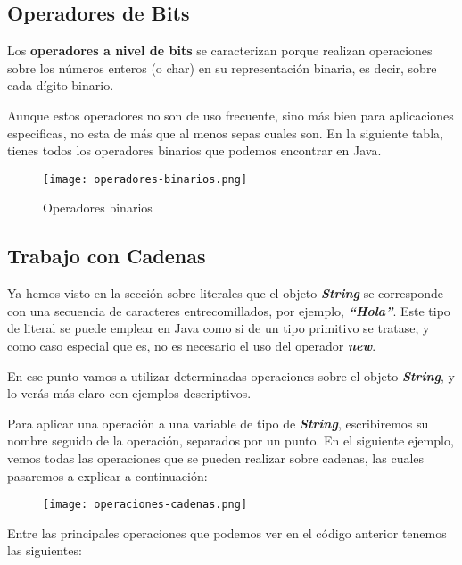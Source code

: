 \subsection{Operadores de Bits}
Los \textbf{operadores a nivel de bits} se caracterizan porque realizan operaciones sobre los números enteros (o char) en su representación binaria, es decir, sobre cada dígito binario.

Aunque estos operadores no son de uso frecuente, sino más bien para aplicaciones especificas, no esta de más que al menos sepas cuales son. En la siguiente tabla, tienes todos los operadores binarios que podemos encontrar en Java.

\begin{figure}[H]
    \centering
    \texttt{[image: operadores-binarios.png]}
    \caption{Operadores binarios}
\end{figure}

\subsection{Trabajo con Cadenas}
Ya hemos visto en la sección sobre literales que el objeto \textbf{\textit{String}} se corresponde con una secuencia de caracteres entrecomillados, por ejemplo, \textbf{\textit{``Hola''}}. Este tipo de literal se puede emplear en Java como si de un tipo primitivo se tratase, y como caso especial que es, no es necesario el uso del operador \textbf{\textit{new}}.

En ese punto vamos a utilizar determinadas operaciones sobre el objeto \textbf{\textit{String}}, y lo verás más claro con ejemplos descriptivos.

Para aplicar una operación a una variable de tipo de \textbf{\textit{String}}, escribiremos su nombre seguido de la operación, separados por un punto. En el siguiente ejemplo, vemos todas las operaciones que se pueden realizar sobre cadenas, las cuales pasaremos a explicar a continuación:

\begin{figure}[H]
    \centering
    \texttt{[image: operaciones-cadenas.png]}
\end{figure}


Entre las principales operaciones que podemos ver en el código anterior tenemos las siguientes:

